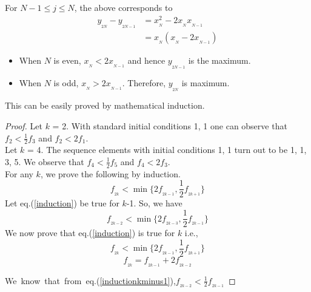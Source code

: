 \begin{multicols}{2}
For\hspace{0.1in} $N-1 \leq j \leq N$,\hspace{0.1in} the above corresponds to
\begin{align}
y_{_{2N}} - y_{_{2N-1}} &= x_{_N}^2 - 2x_{_N}x_{_{N-1}}\label{eq-17.4}\\
&= x_{_N}(x_{_N} - 2x_{_{N-1}})\label{eq-17.5}
\end{align} 

\vspace{-.6cm}

\begin{itemize}
 \setlength{\parskip}{-1pt}
\item When $N$ is even, $x_{_N} < 2x_{_{N-1}}$ and hence $y_{_{2N-1}}$ is the maximum.\\[-.5cm]
\item When $N$ is odd, $x_{_N} > 2x_{_{N-1}}$. Therefore, $y_{_{2N}}$ is maximum.
\end{itemize}

\vspace{-.3cm}

 This can be easily proved by mathematical induction.
\begin{proof}\renewcommand{\qedsymbol}{}
Let $k$ = 2. With standard initial conditions 1, 1 one can observe that $f_2 < \frac{1}{2}f_3$ and $f_2 < 2f_1$.\\
Let $k$ = 4. The sequence elements with initial conditions 1, 1 turn out to be 1, 1, 3, 5. We observe that $f_4 < \frac{1}{2}f_5$ and $f_4 < 2f_3$. \\
For any $k$, we prove the following by induction. 
\begin{equation}
f_{_{2k}} < \min\{2f_{_{2k-1}}, \frac{1}{2}f_{_{2k+1}}\}\label{eq-17.6}
\end{equation}
Let eq.(\ref{induction}) be true for $k$-1. So, we have
\begin{equation}
f_{_{2k-2}} < \min\{2f_{_{2k-3}}, \frac{1}{2}f_{_{2k-1}}\}\label{eq-17.7}
\end{equation}
We now prove that eq.(\ref{induction}) is true for $k$ i.e.,
\begin{equation}\nonumber
f_{_{2k}} < \min\{2f_{_{2k-1}}, \frac{1}{2}f_{_{2k+1}}\}
\end{equation}
\begin{equation}
f_{_{2k}} = f_{_{2k-1}} + 2f_{_{2k-2}}\label{eq-17.8}
\end{equation}

\textup{We~know~that~from~eq.(\ref{inductionkminus1})},\quad $f_{_{2k-2}} < \frac{1}{2}f_{_{2k-1}}$ 


\end{proof}
\end{multicols}
